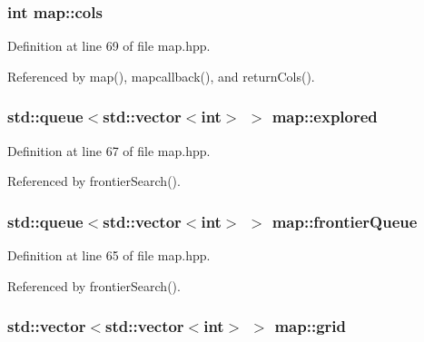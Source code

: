 \subsubsection[{\texorpdfstring{cols}{cols}}]{\setlength{\rightskip}{0pt plus 5cm}int map\+::cols\hspace{0.3cm}{\ttfamily [private]}}\hypertarget{classmap_ad82f9850ab232d78d0cac14c5e6a752f}{}\label{classmap_ad82f9850ab232d78d0cac14c5e6a752f}


Definition at line 69 of file map.\+hpp.



Referenced by map(), mapcallback(), and return\+Cols().

\subsubsection[{\texorpdfstring{explored}{explored}}]{\setlength{\rightskip}{0pt plus 5cm}std\+::queue$<$std\+::vector$<$int$>$ $>$ map\+::explored\hspace{0.3cm}{\ttfamily [private]}}\hypertarget{classmap_ad8a2f40c1520dd9f0f5337abbf81e64f}{}\label{classmap_ad8a2f40c1520dd9f0f5337abbf81e64f}


Definition at line 67 of file map.\+hpp.



Referenced by frontier\+Search().

\subsubsection[{\texorpdfstring{frontier\+Queue}{frontierQueue}}]{\setlength{\rightskip}{0pt plus 5cm}std\+::queue$<$std\+::vector$<$int$>$ $>$ map\+::frontier\+Queue\hspace{0.3cm}{\ttfamily [private]}}\hypertarget{classmap_ad3683241c11549fa2888eadf3465857f}{}\label{classmap_ad3683241c11549fa2888eadf3465857f}


Definition at line 65 of file map.\+hpp.



Referenced by frontier\+Search().

\subsubsection[{\texorpdfstring{grid}{grid}}]{\setlength{\rightskip}{0pt plus 5cm}std\+::vector$<$std\+::vector$<$int$>$ $>$ map\+::grid\hspace{0.3cm}{\ttfamily [private]}}\hypertarget{classmap_a43036b0bcee6beeb4e8f4dfc5019e5fb}{}\label{classmap_a43036b0bcee6beeb4e8f4dfc5019e5fb}


